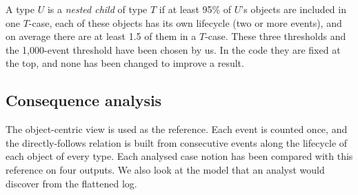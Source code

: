\documentclass[pdflatex,sn-mathphys-num]{sn-jnl}
\begin{document}
A type $U$ is a \emph{nested child} of type $T$ if at least 95\% of $U$'s objects are included in one $T$-case, each of these objects has its own lifecycle (two or more events), and on average there are at least 1.5 of them in a $T$-case. These three thresholds and the 1{,}000-event threshold have been chosen by us. In the code they are fixed at the top, and none has been changed to improve a result.

\subsection{Consequence analysis}\label{sec:consequence}

The object-centric view is used as the reference. Each event is counted once, and the directly-follows relation is built from consecutive events along the lifecycle of each object of every type. Each analysed case notion has been compared with this reference on four outputs. We also look at the model that an analyst would discover from the flattened log.
\end{document}
